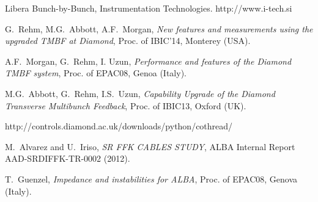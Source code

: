 \documentclass[a4paper,
              ]{jacow}
\begin{document}
\begin{thebibliography}{9} %

Libera Bunch-by-Bunch, Instrumentation Technologies. http://www.i-tech.si

G.~Rehm, M.G.~Abbott, A.F.~Morgan, {\it New features and measurements using the upgraded TMBF at Diamond}, Proc. of IBIC'14, Monterey (USA). 

A.F.~Morgan, G.~Rehm, I. Uzun, {\it Performance and features of the Diamond TMBF system}, Proc. of EPAC08, Genoa (Italy). 

M.G.~Abbott, G.~Rehm, I.S.~Uzun, {\it Capability Upgrade of the Diamond Transverse Multibunch Feedback}, Proc. of IBIC13, Oxford (UK). 

http://controls.diamond.ac.uk/downloads/python/cothread/

M.~Alvarez and U.~Iriso, {\it SR FFK CABLES STUDY}, ALBA Internal Report AAD-SRDIFFK-TR-0002 (2012).

T.~Guenzel, {\it Impedance and instabilities for ALBA}, Proc. of EPAC08, Genova (Italy). 

\end{thebibliography}
\vspace{0mm}
\fi
\end{document}
